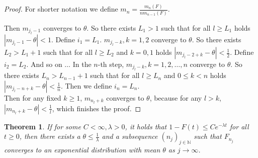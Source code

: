 \documentclass[12pt,a4paper]{scrartcl}
\newtheorem{theorem}{Theorem}[section]
\numberwithin{equation}{section}
\newcommand{\N}{\mathbb{N}} %
\begin{document}
\begin{proof}
For shorter notation we define $m_n = \frac{m_{n}\left(F\right)}{n m_{n-1}\left(F\right)}$.

Then $ m_{j_l - 1} $ converges to $\theta$. So there exists $L_1 > 1$ such that for all $l \geq L_1$ holds $\left|m_{j_l - 1} - \theta \right| < 1$. Define $i_1 = L_1$.\newline
$ m_{j_l - k} , k=1,2 $ converge to $\theta$. So there exists $L_2 > L_1 + 1$ such that for all $l \geq L_2$ and $k=0,1$ holds $\left|m_{j_l - 2+k} - \theta \right| < \frac{1}{2}$. Define $i_2 = L_2$.\newline
And so on $\ldots$\newline
In the $n$-th step, $ m_{j_l - k} , k=1,2,\ldots,n $ converge to $\theta$. So there exists $ L_n > L_{n-1} + 1 $ such that for all $l \geq L_n$ and $ 0 \leq k < n $ holds $\left|m_{j_l - n + k} - \theta \right| < \frac{1}{n}$. Then we define $i_n = L_n$.\\[1ex]

Then for any fixed $k \geq 1$, $m_{n_l + k}$ converges to $\theta$, because for any $l > k$, $ \left| m_{n_l+k} - \theta \right| < \frac{1}{l}$, which finishes the proof.


\end{proof}


\begin{theorem}
\label{Weneeditlater}
If for some $ C < \infty, \lambda > 0 $, it holds that $ 1- F\left(t\right) \leq Ce^{-\lambda t} $ for all $ t \geq 0 $, then there exists a $ \theta \leq \frac{1}{\lambda} $ and a subsequence $\left(n_j\right)_{j \in \N}$ such that $F_{n_j}$ converges to an exponential distribution with mean $\theta$ as $ j \to \infty $.
\end{theorem}
\end{document}
